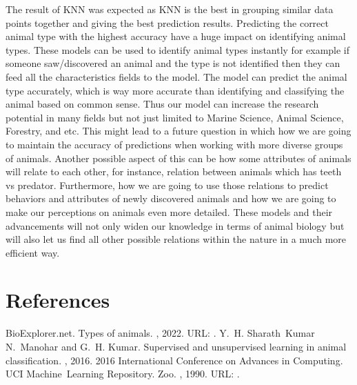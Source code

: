 \documentclass[letterpaper,10pt,english]{jupyterBook}
\begin{document}
\sphinxAtStartPar
The result of KNN was expected as KNN is the best in grouping similar data points together and giving the best prediction results. Predicting the correct animal type with the highest accuracy have a huge impact on identifying animal types. These models can be used to identify animal types instantly for example if someone saw/discovered an animal and the type is not identified then they can feed all the characteristics fields to the model. The model can predict the animal type accurately, which is way more accurate than identifying and classifying the animal based on common sense. Thus our model can increase the research potential in many fields but not just limited to Marine Science, Animal Science, Forestry, and etc. This might lead to a future question in which how we are going to maintain the accuracy of predictions when working with more diverse groups of animals. Another possible aspect of this can be how some attributes of animals will relate to each other, for instance, relation between animals which has teeth vs predator. Furthermore, how we are going to use those relations to predict behaviors and attributes of newly discovered animals and how we are going to make our perceptions on animals even more detailed. These models and their advancements will not only widen our knowledge in terms of animal biology but will also let us find all other possible relations within the nature in a much more efficient way.

\sphinxstepscope


\chapter{References}
\label{\detokenize{references:references}}\label{\detokenize{references::doc}}
\sphinxAtStartPar


\begin{sphinxthebibliography}{1}
\sphinxAtStartPar
BioExplorer.net. Types of animals. , 2022. URL: .
\sphinxAtStartPar
Y. H. Sharath Kumar N. Manohar and G. H. Kumar. Supervised and unsupervised learning in animal classification. , 2016. 2016 International Conference on Advances in Computing.
\sphinxAtStartPar
UCI Machine Learning Repository. Zoo. , 1990. URL: .
\end{sphinxthebibliography}







\renewcommand{\indexname}{Index}
\printindex
\end{document}
